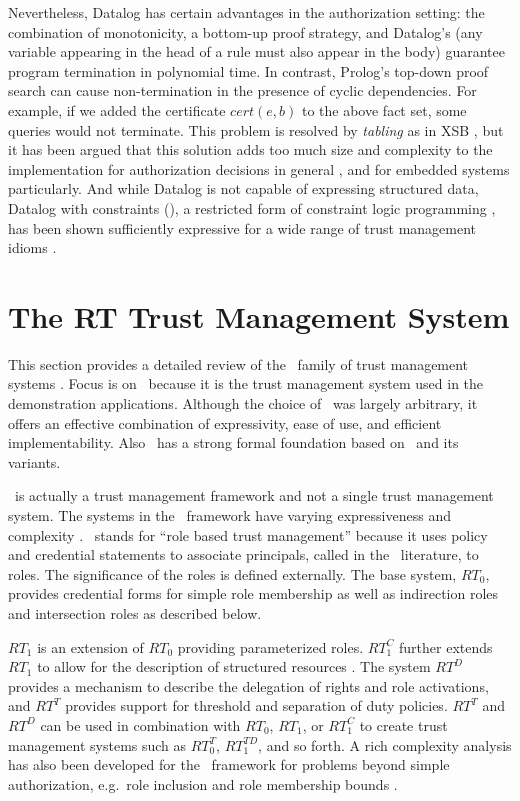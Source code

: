 Nevertheless, Datalog has certain advantages in the authorization setting: the combination of
monotonicity, a bottom-up proof strategy, and Datalog's  (any variable
appearing in the head of a rule must also appear in the body) guarantee program termination in
polynomial time. In contrast, Prolog's top-down proof search can cause non-termination in the
presence of cyclic dependencies. For example, if we added the certificate $\mathit{cert}(e,b)$
to the above fact set, some queries would not terminate. This problem is resolved by
\emph{tabling} as in XSB \cite{xsb-page}, but it has been argued that this solution adds too
much size and complexity to the implementation for authorization decisions in general
\cite{Li:DRBTMF}, and for embedded systems particularly. And while Datalog is not capable of
expressing structured data, Datalog with constraints (\datalogc), a restricted form of
constraint logic programming \cite{jaffar-maher-jlp94}, has been shown sufficiently expressive
for a wide range of trust management idioms \cite{Li:DCFTML}.

\section{The RT Trust Management System}
\label{section-rt}

This section provides a detailed review of the \RT\ family of trust management systems
\cite{Li:DRBTMF}. Focus is on \RT\ because it is the trust management system used in the
demonstration applications. Although the choice of \RT\ was largely arbitrary, it offers
an effective combination of expressivity, ease of use, and efficient implementability. Also
\RT\ has a strong formal foundation based on \datalog\ and its variants.

\RT\ is actually a trust management framework and not a single trust management system. The
systems in the \RT\ framework have varying expressiveness and complexity
\cite{Li:DRBTMF,Li:DCDTM,Li:RRBTMF}. \RT\ stands for ``role based trust management'' because it
uses policy and credential statements to associate principals, called  in the
\RT\ literature, to roles. The significance of the roles is defined externally. The base
system, $RT_0$, provides credential forms for simple role membership as well as indirection
roles and intersection roles as described below.

$RT_1$ is an extension of $RT_0$ providing parameterized roles. $RT_1^C$ further extends
$RT_1$ to allow for the description of structured resources \cite{Li:DCFTML,Li:RRBTMF}. The
system $RT^D$ provides a mechanism to describe the delegation of rights and role activations,
and $RT^T$ provides support for threshold and separation of duty policies. $RT^T$ and $RT^D$
can be used in combination with $RT_0$, $RT_1$, or $RT_1^C$ to create trust management
systems such as $RT_0^T$, $RT_1^{TD}$, and so forth. A rich complexity analysis has also been
developed for the \RT\ framework for problems beyond simple authorization, e.g.~role inclusion
and role membership bounds \cite{Li:BPOCSATM}.

